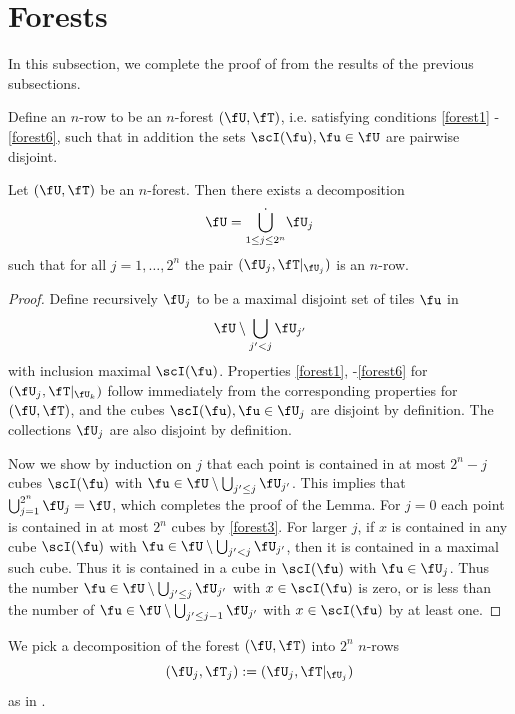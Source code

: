 \section{Forests}
In this subsection, we complete the proof of  from the results of the previous subsections.

Define an $n$-row to be an $n$-forest $(\fU, \fT)$, i.e. satisfying conditions \eqref{forest1} - \eqref{forest6}, such that in addition the sets $\scI(\fu), \fu \in \fU$ are pairwise disjoint.

\begin{lemma}
    \label{forest-row-decomposition}
    Let $(\fU, \fT)$ be an $n$-forest. Then there exists a decomposition
    $$
        \fU = \dot{\bigcup_{1 \le j \le 2^n}} \fU_j
    $$
    such that for all $j = 1, \dotsc, 2^n$ the pair $(\fU_j, \fT|_{\fU_j})$ is an $n$-row.
\end{lemma}

\begin{proof}
    Define recursively $\fU_j$ to be a maximal disjoint set of tiles $\fu$ in
    $$
        \fU \setminus \bigcup_{j' < j} \fU_{j'}
    $$
    with inclusion maximal $\scI(\fu)$. Properties \eqref{forest1}, -\eqref{forest6} for $(\fU_j, \fT|_{\fU_k})$ follow immediately from the corresponding properties for $(\fU, \fT)$, and the cubes $\scI(\fu), \fu \in \fU_j$ are disjoint by definition. The collections $\fU_j$ are also disjoint by definition.

    Now we show by induction on $j$ that each point is contained in at most $2^n - j$ cubes $\scI(\fu)$ with $\fu \in \fU \setminus \bigcup_{j' \le j} \fU_{j'}$. This implies that $\bigcup_{j = 1}^{2^n} \fU_j = \fU$, which completes the proof of the Lemma. For $j = 0$ each point is contained in at most $2^n$ cubes by \eqref{forest3}. For larger $j$, if $x$ is contained in any cube $\scI(\fu)$ with $\fu \in \fU \setminus \bigcup_{j' < j} \fU_{j'}$, then it is contained in a maximal such cube. Thus it is contained in a cube in $\scI(\fu)$ with $\fu \in \fU_j$. Thus the number $\fu \in \fU \setminus \bigcup_{j' \le j} \fU_{j'}$ with $x\in \scI(\fu)$ is zero, or is less than the number of $\fu \in \fU \setminus \bigcup_{j' \le j-1} \fU_{j'}$ with $x \in \scI(\fu)$ by at least one.
\end{proof}

We pick a decomposition of the forest $(\fU, \fT)$ into $2^n$ $n$-rows
\begin{equation*}
(\fU_j, \fT_j) := (\fU_j, \fT|_{\fU_j})
\end{equation*}
as in .

